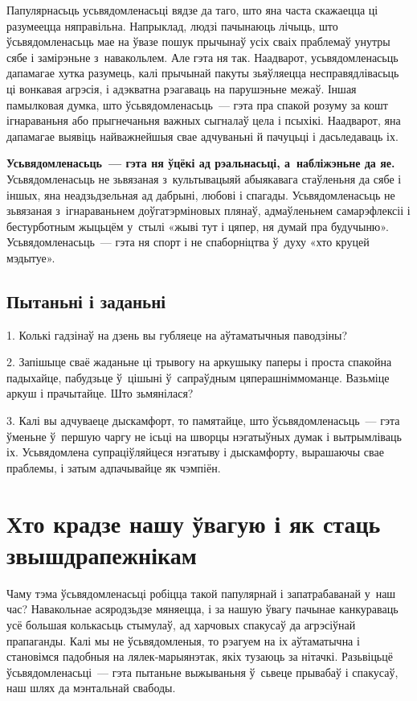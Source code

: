 Папулярнасьць усьвядомленасьці вядзе да таго, што яна часта скажаецца ці разумеецца няправільна. Напрыклад, людзі пачынаюць лічыць, што ўсьвядомленасьць мае на ўвазе пошук прычынаў усіх сваіх праблемаў унутры сябе і замірэньне з~навакольлем. Але гэта ня так. Наадварот, усьвядомленасьць дапамагае хутка разумець, калі прычынай пакуты зьяўляецца несправядлівасьць ці вонкавая агрэсія, і адэкватна рэагаваць на парушэньне межаў. Іншая памылковая думка, што ўсьвядомленасьць~--- гэта пра спакой розуму за кошт ігнараваньня або прыгнечаньня важных сыгналаў цела і псыхікі. Наадварот, яна дапамагае выявіць найважнейшыя свае адчуваньні й пачуцьці і дасьледаваць іх.

\textbf{Усьвядомленасьць~--- гэта ня ўцёкі ад рэальнасьці, а~набліжэньне да яе.} Усьвядомленасьць не зьвязаная з~культывацыяй абыякавага стаўленьня да сябе і іншых, яна неадзьдзельная ад дабрыні, любові і спагады. Усьвядомленасьць не зьвязаная з~ігнараваньнем доўгатэрміновых плянаў, адмаўленьнем самарэфлексіі і бестурботным жыцьцём у~стылі «жыві тут і цяпер, ня думай пра будучыню». Усьвядомленасьць~--- гэта ня спорт і не спаборніцтва ў~духу «хто круцей мэдытуе».

\subsection*{Пытаньні і заданьні}

1. Колькі гадзінаў на дзень вы губляеце на аўтаматычныя паводзіны?

2. Запішыце сваё жаданьне ці трывогу на аркушыку паперы і проста спакойна падыхайце, пабудзьце ў~цішыні ў~сапраўдным цяперашніммоманце. Вазьміце аркуш і прачытайце. Што зьмянілася?

3. Калі вы адчуваеце дыскамфорт, то памятайце, што ўсьвядомленасьць~--- гэта ўменьне ў~першую чаргу не ісьці на шворцы нэгатыўных думак і вытрымліваць іх. Усьвядомлена супраціўляйцеся нэгатыву і дыскамфорту, вырашаючы свае праблемы, і затым адпачывайце як чэмпіён.


\section{Хто крадзе нашу ўвагую і як стаць звышдрапежнікам}

Чаму тэма ўсьвядомленасьці робіцца такой папулярнай і запатрабаванай у~наш час? Навакольнае асяродзьдзе мяняецца, і за нашую ўвагу пачынае канкураваць усё большая колькасьць стымулаў, ад харчовых спакусаў да агрэсіўнай прапаганды. Калі мы не ўсьвядомленыя, то рэагуем на іх аўтаматычна і становімся падобныя на лялек-марыянэтак, якіх тузаюць за нітачкі. Разьвіцьцё ўсьвядомленасьці~--- гэта пытаньне выжываньня ў~сьвеце прывабаў і спакусаў, наш шлях да мэнтальнай свабоды.

